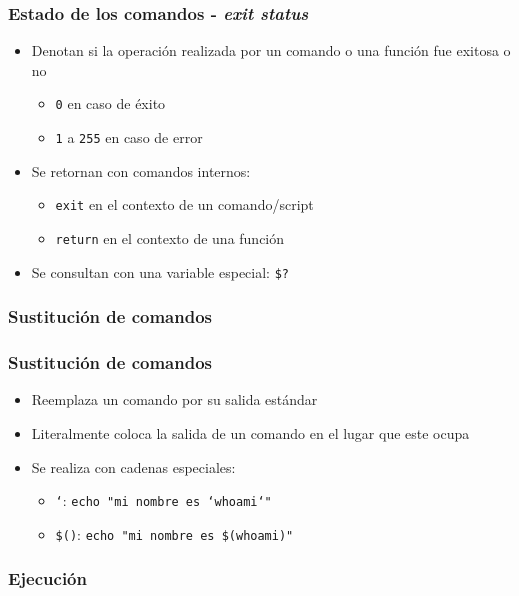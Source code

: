 \begin{frame}
  \frametitle{Estado de los comandos - \textit{exit status}}
  \begin{itemize}
    \item Denotan si la operación realizada por un comando o una función
      fue exitosa o no
      \begin{itemize}
        \item \texttt{0} en caso de éxito
        \item \texttt{1} a \texttt{255} en caso de error
      \end{itemize}
    \item Se retornan con comandos internos:
    \begin{itemize}
      \item \texttt{exit} en el contexto de un comando/script
      \item \texttt{return} en el contexto de una función
    \end{itemize}
    \item Se consultan con una variable especial: \texttt{\$?}
  \end{itemize}
\end{frame}

\subsubsection{Sustitución de comandos}

\begin{frame}
  \frametitle{Sustitución de comandos}
  \begin{itemize}
    \item Reemplaza un comando por su salida estándar
    \item Literalmente coloca la salida de un comando en el lugar que
      este ocupa
    \item Se realiza con cadenas especiales:
    \begin{itemize}
      \item \texttt{`}: \texttt{echo \string"mi nombre es `whoami`\string"}
      \item \texttt{\$()}: \texttt{echo \string"mi nombre es \$(whoami)\string"}
    \end{itemize}
  \end{itemize}
\end{frame}

\subsubsection{Ejecución}

